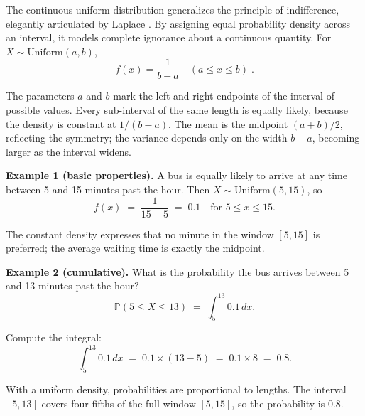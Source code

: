 \documentclass{book}
\begin{document}
The continuous uniform distribution generalizes the principle of indifference, elegantly articulated by Laplace \cite{laplace-probability}. By assigning equal probability density across an interval, it models complete ignorance about a continuous quantity. For $X \sim \text{Uniform}(a,b)$,
\begin{equation}
	f(x) = \frac{1}{b - a} \quad (a \leq x \leq b) \; .
	\label{eq:continuous_uniform}
\end{equation}

The parameters $a$ and $b$ mark the left and right endpoints of the interval of possible values. Every sub-interval of the same length is equally likely, because the density is constant at $1/(b-a)$. The mean is the midpoint $(a+b)/2$, reflecting the symmetry; the variance depends only on the width $b-a$, becoming larger as the interval widens.

\medskip

\textbf{Example 1 (basic properties).} A bus is equally likely to arrive at any time between 5 and 15 minutes past the hour. Then $X \sim \mathrm{Uniform}(5,15)$, so
\begin{equation}
	f(x) \;=\; \frac{1}{15-5} \;=\; 0.1 \quad \text{for } 5 \le x \le 15.
\end{equation}

The constant density expresses that no minute in the window $[5,15]$ is preferred; the average waiting time is exactly the midpoint.

\medskip

\textbf{Example 2 (cumulative).} What is the probability the bus arrives between 5 and 13 minutes past the hour?
\begin{equation}
	\mathbb{P}(5 \le X \le 13) \;=\; \int_{5}^{13} 0.1 \, dx.
\end{equation}

Compute the integral:
\begin{equation}
	\int_{5}^{13} 0.1 \, dx \;=\; 0.1 \times (13-5) \;=\; 0.1 \times 8 \;=\; 0.8.
\end{equation}

With a uniform density, probabilities are proportional to lengths. The interval $[5,13]$ covers four-fifths of the full window $[5,15]$, so the probability is $0.8$.
\end{document}
